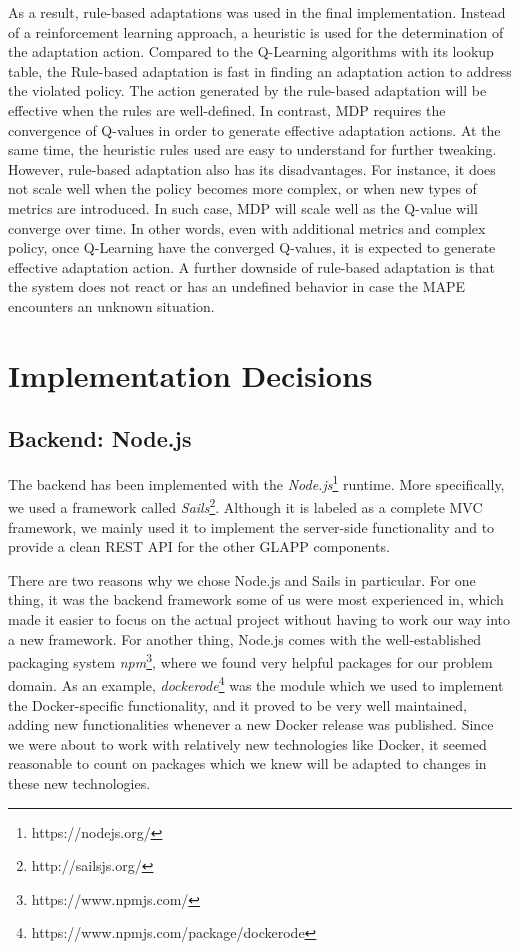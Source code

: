 \documentclass{seal_thesis}
\begin{document}
As a result, rule-based adaptations was used in the final implementation.
Instead of a reinforcement learning approach, a heuristic is used for the determination of the adaptation action.
Compared to the Q-Learning algorithms with its lookup table, the Rule-based adaptation is fast in finding an adaptation action to address the violated policy.
The action generated by the rule-based adaptation will be effective when the rules are well-defined.
In contrast, MDP requires the convergence of Q-values in order to generate effective adaptation actions.
At the same time, the heuristic rules used are easy to understand for further tweaking.
However, rule-based adaptation also has its disadvantages.
For instance, it does not scale well when the policy becomes more complex, or when new types of metrics are introduced.
In such case, MDP will scale well as the Q-value will converge over time.
In other words, even with additional metrics and complex policy, once Q-Learning have the converged Q-values, it is expected to generate effective adaptation action.
A further downside of rule-based adaptation is that the system does not react or has an undefined behavior in case the MAPE encounters an unknown situation.

\section{Implementation Decisions}
\subsection{Backend: Node.js}
The backend has been implemented with the \textit{Node.js}\footnote{https://nodejs.org/} runtime.
More specifically, we used a framework called \textit{Sails}\footnote{http://sailsjs.org/}.
Although it is labeled as a complete MVC framework, we mainly used it to implement the server-side functionality and to provide a clean REST API for the other GLAPP components.

There are two reasons why we chose Node.js and Sails in particular.
For one thing, it was the backend framework some of us were most experienced in, which made it easier to focus on the actual project without having to work our way into a new framework.
For another thing, Node.js comes with the well-established packaging system \textit{npm}\footnote{https://www.npmjs.com/}, where we found very helpful packages for our problem domain.
As an example, \textit{dockerode}\footnote{https://www.npmjs.com/package/dockerode} was the module which we used to implement the Docker-specific functionality, and it proved to be very well maintained, adding new functionalities whenever a new Docker release was published.
Since we were about to work with relatively new technologies like Docker, it seemed reasonable to count on packages which we knew will be adapted to changes in these new technologies.
\end{document}
